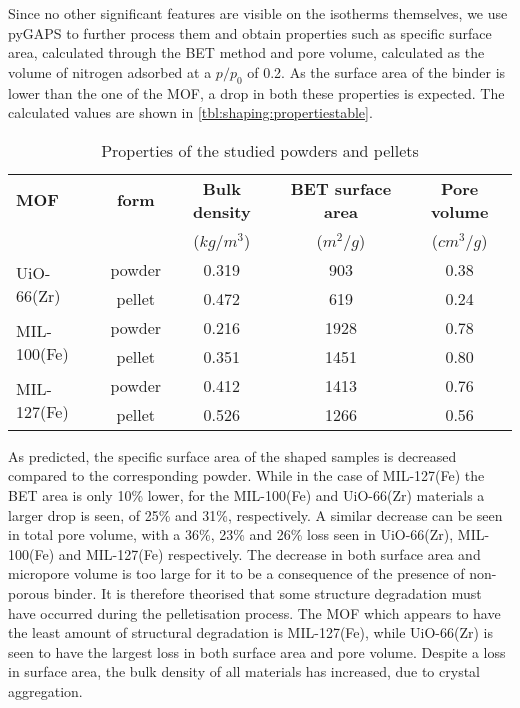 Since no other significant features are visible on the isotherms themselves,
we use pyGAPS to further process them and obtain properties
such as specific surface area, calculated through the \gls{BET} method and pore
volume, calculated as the volume of nitrogen
adsorbed at a \(p/p_0\) of 0.2.
As the surface area of the binder is lower than the
one of the \gls{MOF}, a drop in both these properties is expected.
The calculated values are shown in
\autoref{tbl:shaping:propertiestable}.

\begin{table}[htb]
	\centering
	\caption{Properties of the studied powders and pellets}
	\begin{tabular}{lcccc}
		\toprule
		\textbf{MOF}
		                             & \textbf{form}
		                             & \textbf{Bulk density}
		                             & \textbf{BET surface area}
		                             & \textbf{Pore volume} \\
		                             &                           & (\(kg/m^3\)) & (\(m^2/g\)) & (\(cm^3/g\)) \\
		\midrule
		\multirow{2}{*}{UiO-66(Zr)}  & powder          & 0.319        & 903         & 0.38         \\
		                             & pellet          & 0.472        & 619         & 0.24         \\
		\multirow{2}{*}{MIL-100(Fe)} & powder          & 0.216        & 1928        & 0.78         \\
		                             & pellet          & 0.351        & 1451        & 0.80         \\
		\multirow{2}{*}{MIL-127(Fe)} & powder          & 0.412        & 1413        & 0.76         \\
		                             & pellet          & 0.526        & 1266        & 0.56         \\
		\bottomrule
	\end{tabular}%
	\label{tbl:shaping:propertiestable}
\end{table}%

As predicted, the specific surface area of the shaped samples is
decreased compared to the corresponding powder. While in the case
of MIL-127(Fe) the \gls{BET} area is only 10\% lower, for the MIL-100(Fe)
and UiO-66(Zr) materials a larger drop is seen, of 25\% and 31\%,
respectively.
A similar decrease can be seen in total pore volume,
with a 36\%, 23\% and 26\% loss seen
in UiO-66(Zr), MIL-100(Fe) and MIL-127(Fe) respectively.
The decrease in both surface area and micropore volume is
too large for it to be a consequence of the presence of non-porous binder.
It is therefore theorised that some structure degradation must have
occurred during the pelletisation process. The \gls{MOF} which
appears to have the least amount of structural degradation is MIL-127(Fe),
while UiO-66(Zr) is seen to have the largest loss in both surface 
area and pore volume. 
Despite a loss in surface area, the bulk density of all materials
has increased, due to crystal aggregation.